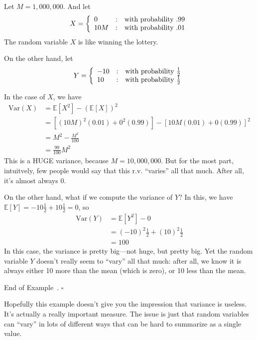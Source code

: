 \documentclass[10pt]{article}
\theoremstyle{definition}
\newtheorem{example}[theorem]{Example}
\renewenvironment{example}
{\begin{oldexample}}
  {\par\smallskip\hfill   End of Example~\theexample. $\square$    \par\end{oldexample}}
\newcommand{\1}[1]{\textbf{1}_{\left[#1\right]}} %
\def\E{\mathbb{E}} %
\def\Var{\mathrm{Var}} %
\begin{document}
\begin{example}
  Let $M = 1,000,000$. And let
  \begin{equation*}
    X = \left\{ \begin{array}{l@{\quad:\quad}l} 0 & \text{with probability } .99  \\ 10M &
        \text{with probability }.01 \end{array}\right.
  \end{equation*}
  The random variable $X$ is like winning the lottery.

  On the other hand,  let
  \begin{equation*}
    Y = \left\{ \begin{array}{l@{\quad:\quad}l} -10 & \text{with probability }\frac{1}{2}\\ 10 & \text{with probability }\frac{1}{2} \end{array}\right.
  \end{equation*}

  In the case of $X$, we have
  \begin{align*}
    \Var(X) 
    &= \E\left[X^{2} \right] - \left( \E\left[X \right] \right)^{2}\\
    &= \left[(10M)^{2}(0.01)+ 0^{2}(0.99)\right] - \left[10M(0.01)+ 0(0.99)\right]^{2}\\
    &= M^{2} - \frac{M^{2}}{100}\\
    &= \frac{99}{100}M^{2}
  \end{align*}
  This is a HUGE variance, because $M=10,000,000$. But for the most part, intuitvely, few people would
  say that this r.v. ``varies'' all that much. After all, it's almost always $0$.


  On the other hand, what if we compute the variance of $Y$? In this, we have $\E\left[Y
  \right]=-10\frac{1}{2}+10\frac{1}{2}=0$, so
  \begin{align*}
    \Var(Y) 
    &= \E\left[Y^{2} \right]-0\\
    &= (-10)^{2}\frac{1}{2} + (10)^{2}\frac{1}{2}\\
    &= 100
  \end{align*}
  In this case, the variance is pretty big---not huge, but pretty big. Yet the random variable $Y$
  doesn't really seem to ``vary'' all that much: after all, we know it is always either 10 more than the
  mean (which is zero), or 10 less than the mean.
\end{example}

Hopefully this example doesn't give you the impression that variance is useless. It's actually a really
important measure. The issue is just that random variables can ``vary'' in lots of different ways that
can be hard to summarize as a single value.
\end{document}
